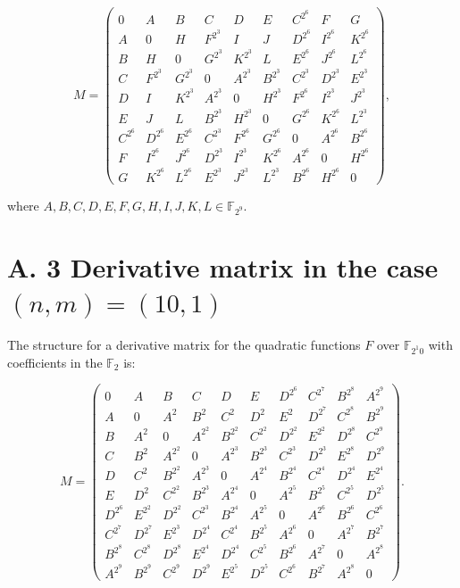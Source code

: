 \documentclass[10pt]{article}
\begin{document}
\[
M=\left(\begin{array}{ccccccccc}
0 & A & B & C & D & E & C^{2^{6}} & F & G  \tag{21}\\
A & 0 & H & F^{2^{3}} & I & J & D^{2^{6}} & I^{2^{6}} & K^{2^{6}} \\
B & H & 0 & G^{2^{3}} & K^{2^{3}} & L & E^{2^{6}} & J^{2^{6}} & L^{2^{6}} \\
C & F^{2^{3}} & G^{2^{3}} & 0 & A^{2^{3}} & B^{2^{3}} & C^{2^{3}} & D^{2^{3}} & E^{2^{3}} \\
D & I & K^{2^{3}} & A^{2^{3}} & 0 & H^{2^{3}} & F^{2^{6}} & I^{2^{3}} & J^{2^{3}} \\
E & J & L & B^{2^{3}} & H^{2^{3}} & 0 & G^{2^{6}} & K^{2^{6}} & L^{2^{3}} \\
C^{2^{6}} & D^{2^{6}} & E^{2^{6}} & C^{2^{3}} & F^{2^{6}} & G^{2^{6}} & 0 & A^{2^{6}} & B^{2^{6}} \\
F & I^{2^{6}} & J^{2^{6}} & D^{2^{3}} & I^{2^{3}} & K^{2^{6}} & A^{2^{6}} & 0 & H^{2^{6}} \\
G & K^{2^{6}} & L^{2^{6}} & E^{2^{3}} & J^{2^{3}} & L^{2^{3}} & B^{2^{6}} & H^{2^{6}} & 0
\end{array}\right),
\]

where $A, B, C, D, E, F, G, H, I, J, K, L \in \mathbb{F}_{2^{9}}$.

\section*{A. 3 Derivative matrix in the case $(n, m)=(10,1)$}
The structure for a derivative matrix for the quadratic functions $F$ over $\mathbb{F}_{2^{1} 0}$ with coefficients in the $\mathbb{F}_{2}$ is:

\[
M=\left(\begin{array}{cccccccccc}
0 & A & B & C & D & E & D^{2^{6}} & C^{2^{7}} & B^{2^{8}} & A^{2^{9}}  \tag{22}\\
A & 0 & A^{2} & B^{2} & C^{2} & D^{2} & E^{2} & D^{2^{7}} & C^{2^{8}} & B^{2^{9}} \\
B & A^{2} & 0 & A^{2^{2}} & B^{2^{2}} & C^{2^{2}} & D^{2^{2}} & E^{2^{2}} & D^{2^{8}} & C^{2^{9}} \\
C & B^{2} & A^{2^{2}} & 0 & A^{2^{3}} & B^{2^{3}} & C^{2^{3}} & D^{2^{3}} & E^{2^{8}} & D^{2^{9}} \\
D & C^{2} & B^{2^{2}} & A^{2^{3}} & 0 & A^{2^{4}} & B^{2^{4}} & C^{2^{4}} & D^{2^{4}} & E^{2^{4}} \\
E & D^{2} & C^{2^{2}} & B^{2^{3}} & A^{2^{4}} & 0 & A^{2^{5}} & B^{2^{5}} & C^{2^{5}} & D^{2^{5}} \\
D^{2^{6}} & E^{2^{2}} & D^{2^{2}} & C^{2^{3}} & B^{2^{4}} & A^{2^{5}} & 0 & A^{2^{6}} & B^{2^{6}} & C^{2^{6}} \\
C^{2^{7}} & D^{2^{7}} & E^{2^{3}} & D^{2^{4}} & C^{2^{4}} & B^{2^{5}} & A^{2^{6}} & 0 & A^{2^{7}} & B^{2^{7}} \\
B^{2^{8}} & C^{2^{8}} & D^{2^{8}} & E^{2^{4}} & D^{2^{4}} & C^{2^{5}} & B^{2^{6}} & A^{2^{7}} & 0 & A^{2^{8}} \\
A^{2^{9}} & B^{2^{9}} & C^{2^{9}} & D^{2^{9}} & E^{2^{5}} & D^{2^{5}} & C^{2^{6}} & B^{2^{7}} & A^{2^{8}} & 0
\end{array}\right) .
\]
\end{document}
